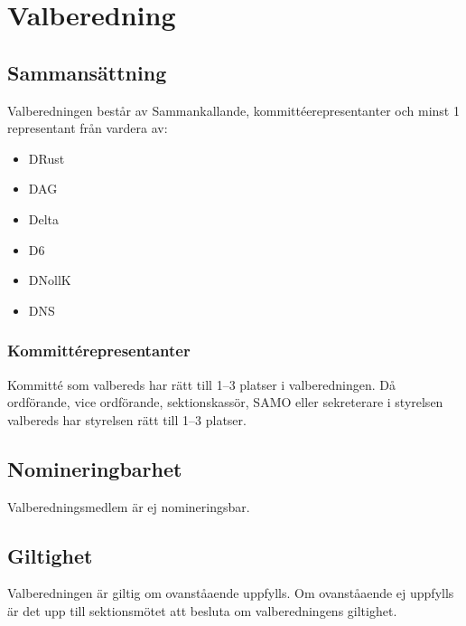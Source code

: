 \section{Valberedning}
\subsection{Sammansättning}
Valberedningen består av Sammankallande, kommittéerepresentanter och minst 1 representant från vardera av:
\begin{itemize}
  \item DRust
  \item DAG 
  \item Delta 
  \item D6 
  \item DNollK
  \item DNS
\end{itemize}

\subsubsection{Kommittérepresentanter}
Kommitté som valbereds har rätt till 1--3 platser i valberedningen. Då ordförande, vice ordförande, sektionskassör, SAMO eller sekreterare i styrelsen valbereds har styrelsen rätt till 1--3 platser.

\subsection{Nomineringbarhet}
Valberedningsmedlem är ej nomineringsbar.

\subsection{Giltighet}
Valberedningen är giltig om ovanståaende uppfylls. Om ovanståaende ej uppfylls är det upp till sektionsmötet att besluta om valberedningens giltighet.
